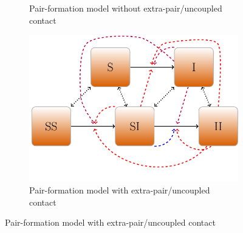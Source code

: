 \documentclass{article}
\begin{document}
\begin{figure}[t!p]
\begin{subfigure}[b]{0.5\linewidth}
	\centering
\caption{Pair-formation model without extra-pair/uncoupled contact}
\end{subfigure}
\begin{subfigure}[b]{0.5\linewidth}
	\centering
	\includegraphics{tikz-f4}
\caption{Pair-formation model with extra-pair/uncoupled contact}
\end{subfigure}
\end{figure}
\end{document}
